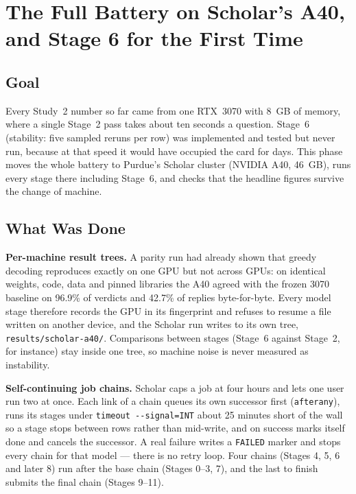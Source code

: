 \chapter{The Full Battery on Scholar's A40, and Stage 6 for the First Time}
\label{chap:s2-1}

\section{Goal}

Every Study~2 number so far came from one RTX~3070 with 8~GB of memory, where a single Stage~2 pass takes
about ten seconds a question. Stage~6 (stability: five sampled reruns per row) was implemented and tested but
never run, because at that speed it would have occupied the card for days. This phase moves the whole
battery to Purdue's Scholar cluster (NVIDIA A40, 46~GB), runs every stage there including Stage~6, and
checks that the headline figures survive the change of machine.

\section{What Was Done}

\textbf{Per-machine result trees.} A parity run had already shown that greedy decoding reproduces exactly on
one GPU but not across GPUs: on identical weights, code, data and pinned libraries the A40 agreed with the
frozen 3070 baseline on 96.9\% of verdicts and 42.7\% of replies byte-for-byte. Every model stage therefore
records the GPU in its fingerprint and refuses to resume a file written on another device, and the Scholar
run writes to its own tree, \texttt{results/scholar-a40/}. Comparisons between stages (Stage~6 against
Stage~2, for instance) stay inside one tree, so machine noise is never measured as instability.

\textbf{Self-continuing job chains.} Scholar caps a job at four hours and lets one user run two at once.
Each link of a chain queues its own successor first (\texttt{afterany}), runs its stages under
\texttt{timeout -{}-signal=INT} about 25 minutes short of the wall so a stage stops between rows rather than
mid-write, and on success marks itself done and cancels the successor. A real failure writes a
\texttt{FAILED} marker and stops every chain for that model --- there is no retry loop. Four chains
(Stages 4, 5, 6 and later 8) run after the base chain (Stages 0--3, 7), and the last to finish submits the
final chain (Stages 9--11).

